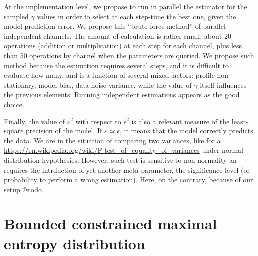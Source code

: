 \documentclass{article}
\begin{document}
At the implementation level, we propose to run in parallel the estimator for the sampled $\gamma$ values in order to select at each step-time the best one, given the model prediction error. We propose this ``brute force method'' of parallel independent channels. The amount of calculation is rather small, about 20 operations (addition or multiplication) at each step for each channel, plus less than 50 operations by channel when the parameters are queried. We propose such method because the estimation requires several steps, and it is difficult to evaluate how many, and is a function of several mixed factors: profile non-stationary, model bias, data noise variance, while the value of $\gamma$ itself influences the previous elements. Running independent estimations appears as the good choice.

Finally, the value of $\varepsilon^2$ with respect to $\epsilon^2$ is also a relevant measure of the least-square precision of the model. If $\varepsilon \simeq \epsilon$, it means that the model correctly predicts the data. We are in the situation of comparing two variances, like for a \href{F-test}{https://en.wikipedia.org/wiki/F-test\_of\_equality\_of\_variances} under normal distribution hypothesies. However, such test is sensitive to non-normality an requires the intrduction of yet another meta-parameter, the significance level (or probability to perform a wrong estimation). Here, on the contrary, because of our setup @todo

\clearpage \section{Bounded constrained maximal entropy distribution} \label{bcmed}
\end{document}
